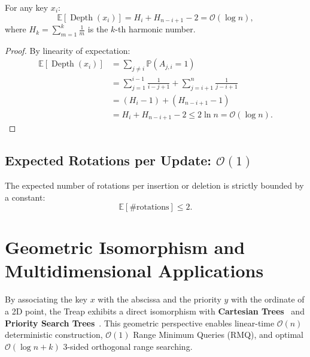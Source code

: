 \begin{theorem}
For any key $x_i$:
\begin{equation}
  \mathbb{E}[\operatorname{Depth}(x_i)] = H_i + H_{n - i + 1} - 2 = \mathcal{O}(\log n),
\end{equation}
where $H_k = \sum_{m=1}^k \frac{1}{m}$ is the $k$-th harmonic number.
\end{theorem}

\begin{proof}
By linearity of expectation:
\begin{align}
  \mathbb{E}[\operatorname{Depth}(x_i)] &= \sum_{j \neq i} \mathbb{P}(A_{j, i} = 1) \nonumber \\
  &= \sum_{j=1}^{i-1} \frac{1}{i - j + 1} + \sum_{j=i+1}^n \frac{1}{j - i + 1} \nonumber \\
  &= (H_i - 1) + (H_{n - i + 1} - 1) \nonumber \\
  &= H_i + H_{n - i + 1} - 2 \le 2 \ln n = \mathcal{O}(\log n).
\end{align}
\end{proof}

\subsection{Expected Rotations per Update: $\mathcal{O}(1)$}
\begin{theorem}
The expected number of rotations per insertion or deletion is strictly bounded by a constant:
\begin{equation}
  \mathbb{E}[\# \text{rotations}] \le 2.
\end{equation}
\end{theorem}

\FloatBarrier
\section[Geometric Isomorphism and Applications]{Geometric Isomorphism and Multidimensional Applications}
\label{sec:geometric-applications-en}

By associating the key $x$ with the abscissa and the priority $y$ with the ordinate of a 2D point, the Treap exhibits a direct isomorphism with \textbf{Cartesian Trees}~\cite{vuillemin1980} and \textbf{Priority Search Trees}~\cite{mccreight1985}. This geometric perspective enables linear-time $\mathcal{O}(n)$ deterministic construction, $\mathcal{O}(1)$ Range Minimum Queries (RMQ), and optimal $\mathcal{O}(\log n + k)$ 3-sided orthogonal range searching.

